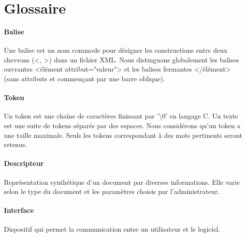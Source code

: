\section{Glossaire}
\paragraph{Balise}
Une balise est un nom commode pour désigner les constructions entre deux chevrons (<, >) dans un fichier XML. Nous distinguons globalement les balises ouvrantes <élément attribut="valeur"> et les balises fermantes </élément> (sans attributs et commençant par une barre oblique).

\paragraph{Token}
Un token est une chaîne de caractères finissant par '\textbackslash 0' en langage C. Un texte est une suite de tokens séparés par des espaces. Nous considérons qu’un token a une taille maximale. Seuls les tokens correspondant à des mots pertinents seront retenus.

\paragraph{Descripteur}
Représentation synthétique d’un document par diverses informations. Elle varie selon le type du document et les paramètres choisis par l’administrateur.

\paragraph{Interface}
Dispositif qui permet la communication entre un utilisateur et le logiciel.